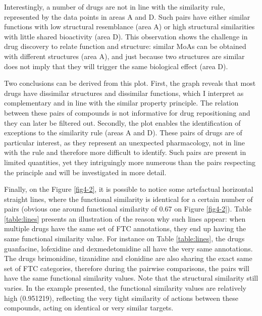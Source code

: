 Interestingly, a number of drugs are not in line with the similarity rule, represented by the data points in areas A and D. Such pairs have either similar functions with low structural resemblance (area A) or high structural similarities with little shared bioactivity (area D). This observation shows the challenge in drug discovery to relate function and structure: similar MoAs can be obtained with different structures (area A), and just because two structures are similar does not imply that they will trigger the same biological effect (area D).

Two conclusions can be derived from this plot. First, the graph reveals that most drugs have dissimilar structures and dissimilar functions, which I interpret as complementary and in line with the similar property principle. The relation between these pairs of compounds is not informative for drug repositioning and they can later be filtered out. Secondly, the plot enables the identification of exceptions to the similarity rule (areas A and D). These pairs of drugs are of particular interest, as they represent an unexpected pharmacology, not in line with the rule and therefore more difficult to identify. Such pairs are present in limited quantities, yet they intriguingly more numerous than the pairs respecting the principle and will be investigated in more detail.

Finally, on the Figure \ref{fig4-2}, it is possible to notice some artefactual horizontal straight lines, where the functional similarity is identical for a certain number of pairs (obvious one around functional similarity of 0.67 on Figure \ref{fig4-2}). Table \ref{table:lines} presents an illustration of the reason why such lines appear: when multiple drugs have the same set of FTC annotations, they end up having the same functional similarity value. For instance on Table \ref{table:lines}, the drugs guanfacine, lofexidine and dexmedetomidine all have the very same annotations. The drugs brimonidine, tizanidine and clonidine are also sharing the exact same set of FTC categories, therefore during the pairwise comparisons, the pairs will have the same functional similarity values. Note that the structural similarity still varies. In the example presented, the functional similarity values are relatively high (0.951219), reflecting the very tight similarity of actions between these compounds, acting on identical or very similar targets.

